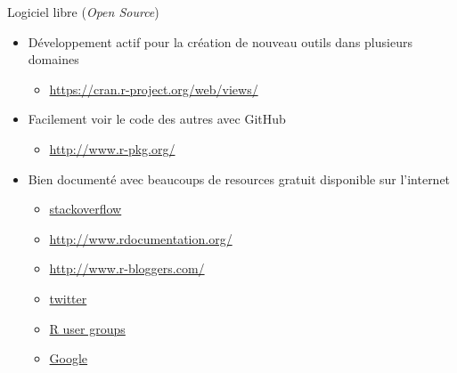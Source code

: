 \documentclass[11pt]{beamer}\usepackage[]{graphicx}\usepackage[]{color}
\begin{document}
\begin{frame}{Logiciel libre (\textit{Open Source})}

\begin{itemize}
  \setlength\itemsep{1.5em}
\item D\'{e}veloppement actif pour la cr\'{e}ation de nouveau outils dans plusieurs domaines  
\begin{itemize}
\item \href{https://cran.r-project.org/web/views/}{https://cran.r-project.org/web/views/}
\end{itemize} 
\item Facilement voir le code des autres avec GitHub 
\begin{itemize}Moin compliqué
\item \href{http://www.r-pkg.org/}{http://www.r-pkg.org/}
\end{itemize}
\item Bien document\'{e} avec beaucoups de resources gratuit disponible sur l'internet  
\begin{itemize}
\item \href{http://stackoverflow.com/questions/tagged/r}{stackoverflow}
\item \href{http://www.rdocumentation.org/}{http://www.rdocumentation.org/} \item \href{http://www.r-bloggers.com/}{http://www.r-bloggers.com/} 
\item \href{https://twitter.com/search?q=\%23rstats}{twitter} 
\item \href{http://blog.revolutionanalytics.com/local-r-groups.html}{R user groups}
\item \href{https://www.google.ca/}{Google}
\end{itemize}
\end{itemize}


\end{frame}
\end{document}
